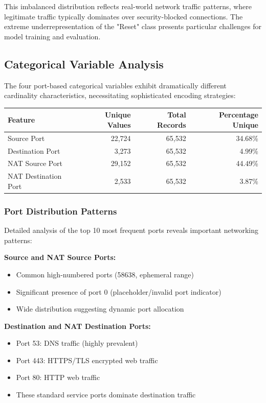 \documentclass[12pt,a4paper]{article}
\begin{document}
This imbalanced distribution reflects real-world network traffic patterns, where legitimate traffic typically dominates over security-blocked connections. The extreme underrepresentation of the "Reset" class presents particular challenges for model training and evaluation.

\subsection{Categorical Variable Analysis}

The four port-based categorical variables exhibit dramatically different cardinality characteristics, necessitating sophisticated encoding strategies:

\begin{center}
\begin{tabular}{|l|r|r|r|}
\hline
\textbf{Feature} & \textbf{Unique Values} & \textbf{Total Records} & \textbf{Percentage Unique} \\
\hline
Source Port & 22,724 & 65,532 & 34.68\% \\
\hline
Destination Port & 3,273 & 65,532 & 4.99\% \\
\hline
NAT Source Port & 29,152 & 65,532 & 44.49\% \\
\hline
NAT Destination Port & 2,533 & 65,532 & 3.87\% \\
\hline
\end{tabular}
\end{center}

\subsubsection{Port Distribution Patterns}

Detailed analysis of the top 10 most frequent ports reveals important networking patterns:

\textbf{Source and NAT Source Ports:}
\begin{itemize}
    \item Common high-numbered ports (58638, ephemeral range)
    \item Significant presence of port 0 (placeholder/invalid port indicator)
    \item Wide distribution suggesting dynamic port allocation
\end{itemize}

\textbf{Destination and NAT Destination Ports:}
\begin{itemize}
    \item Port 53: DNS traffic (highly prevalent)
    \item Port 443: HTTPS/TLS encrypted web traffic
    \item Port 80: HTTP web traffic
    \item These standard service ports dominate destination traffic
\end{itemize}
\end{document}
